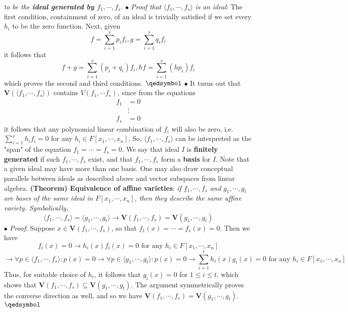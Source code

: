 \documentclass{article}
\begin{document}
\indent \textit{to be the \textbf{ideal generated by $ f_1, \cdots, f_s $}.}
\newline
\indent $ \bullet $ \textit{Proof that $ \langle f_1, \cdots, f_s \rangle $ is an ideal}: The first condition, containment of zero, of an ideal is trivially satisfied if we set every $ h_i $ to be the zero function. Next, given
$$ f = \sum_{i = 1}^s p_i f_i, g = \sum_{i = 1}^s q_i f_i $$
it follows that
$$ f + g = \sum_{i = 1}^s (p_i + q_i) f_i, hf = \sum_{i = 1}^s (h p_i) f_i $$
which proves the second and third conditions. $ \qedsymbol $
\newline
\indent $ \bullet $ It turns out that $ \mathbf{V} \left( \langle f_1, \cdots, f_s \rangle \right) $ contains $ V(f_1, \cdots f_s) $, since from the equations
$$ \begin{aligned}
	f_1 &= 0 \\
	&\vdots \\
	f_s &= 0
\end{aligned} $$
\indent it follows that any polynomial linear combination of $ f_i $ will also be zero, i.e. $ \sum_{i = 1}^s h_i f_i = 0 $ for any $ h_i \in F[x_1, \cdots, x_n] $. So, $ \langle f_1, \cdots, f_s \rangle $ can be interpreted as the "span" of the equation $ f_1 = \cdots = f_s = 0 $. We say that ideal $ I $ is \textbf{finitely generated} if such $ f_1, \cdots, f_s $ exist, and that $ f_1, \cdots, f_s $ form a \textbf{basis} for $ I $. Note that a given ideal may have more than one basis. One may also draw conceptual parallels between ideals as described above and vector subspaces from linear algebra.
\newline \newline
\textbf{(Theorem) Equivalence of affine varieties}: \textit{if $ f_1, \cdots, f_s $ and $ g_1, \cdots, g_t $ are bases of the same ideal in $ F[x_1, \cdots, x_n] $, then they describe the same affine variety. Symbolically,}
$$ \langle f_1, \cdots, f_s \rangle = \langle g_1, \cdots, g_t \rangle \rightarrow \mathbf{V}(f_1, \cdots, f_s) = \mathbf{V}(g_1, \cdots, g_t) $$
\indent $ \bullet $ \textit{Proof}: Suppose $ x \in \mathbf{V}(f_1, \cdots, f_s) $, so that $ f_1(x) = \cdots = f_s(x) = 0 $. Then we have
$$ f_i(x) = 0 \rightarrow h_i(x) f_i(x) = 0 \text{ for any } h_i \in F[x_1, \cdots, x_n] $$
$$ \rightarrow \forall p \in \langle f_1, \cdots, f_s \rangle: p(x) = 0 \rightarrow \forall p \in \langle g_1, \cdots, g_t \rangle: p(x) = 0 \rightarrow \sum_{i = 1}^t h_i(x) g_i(x) = 0 \text{ for any } h_i \in F[x_1, \cdots, x_n] $$
Thus, for suitable choice of $ h_i $, it follows that $ g_i(x) = 0 $ for $ 1 \leq i \leq t $, which shows that $ \mathbf{V}(f_1, \cdots, f_s) \subseteq \mathbf{V}(g_1, \cdots, g_t) $. The argument symmetrically proves the converse direction as well, and so we have $ \mathbf{V}(f_1, \cdots, f_s) = \mathbf{V}(g_1, \cdots, g_t) $. $ \qedsymbol $
\end{document}
